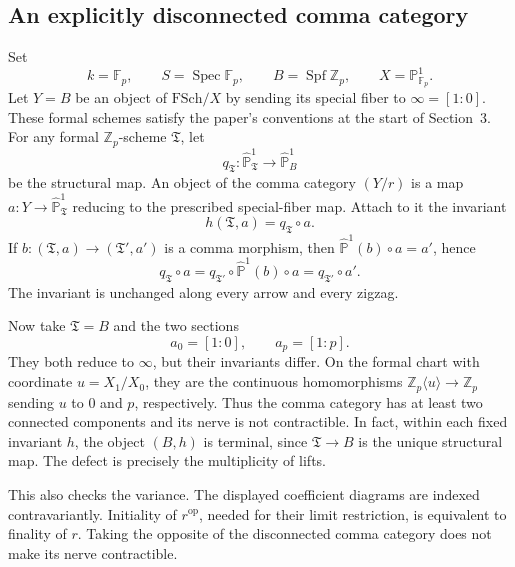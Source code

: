 \documentclass[10pt]{article}
\begin{document}
\subsection*{An explicitly disconnected comma category}
Set \[k=\mathbb F_p,\qquad S=\operatorname{Spec}\mathbb F_p,\qquad
 B=\operatorname{Spf}\mathbb Z_p,\qquad X=\mathbb P^1_{\mathbb F_p}.\] Let \(Y=B\) be an object of \(\mathrm{FSch}/X\) by sending its special fiber to \(\infty=[1:0]\). These formal schemes satisfy the paper’s conventions at the start of Section 3. For any formal \(\mathbb Z_p\)-scheme \(\mathfrak T\), let \[q_{\mathfrak T}:\widehat{\mathbb P}^1_{\mathfrak T}
       \longrightarrow\widehat{\mathbb P}^1_B\] be the structural map. An object of the comma category \((Y/r)\) is a map \(a:Y\to\widehat{\mathbb P}^1_{\mathfrak T}\) reducing to the prescribed special-fiber map. Attach to it the invariant \[h(\mathfrak T,a)=q_{\mathfrak T}\circ a.\] If \(b:(\mathfrak T,a)\to(\mathfrak T',a')\) is a comma morphism, then \(\widehat{\mathbb P}^1(b)\circ a=a'\), hence \[q_{\mathfrak T}\circ a
   =q_{\mathfrak T'}\circ\widehat{\mathbb P}^1(b)\circ a
   =q_{\mathfrak T'}\circ a'.\] The invariant is unchanged along every arrow and every zigzag.\par
Now take \(\mathfrak T=B\) and the two sections \[a_0=[1:0],\qquad a_p=[1:p].\] They both reduce to \(\infty\), but their invariants differ. On the formal chart with coordinate \(u=X_1/X_0\), they are the continuous homomorphisms \(\mathbb Z_p\langle u\rangle\to\mathbb Z_p\) sending \(u\) to \(0\) and \(p\), respectively. Thus the comma category has at least two connected components and its nerve is not contractible. In fact, within each fixed invariant \(h\), the object \((B,h)\) is terminal, since \(\mathfrak T\to B\) is the unique structural map. The defect is precisely the multiplicity of lifts.\par
This also checks the variance. The displayed coefficient diagrams are indexed contravariantly. Initiality of \(r^{\mathrm{op}}\), needed for their limit restriction, is equivalent to finality of \(r\). Taking the opposite of the disconnected comma category does not make its nerve contractible.\par
\end{document}
